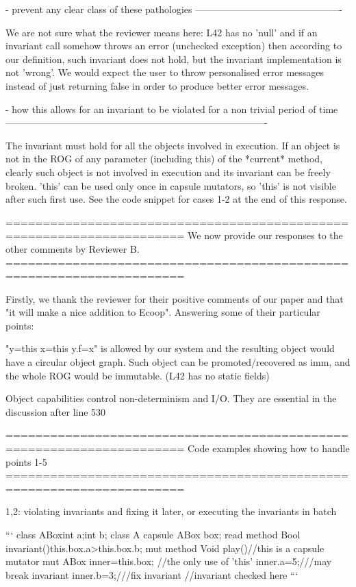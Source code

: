 - prevent any clear class of these pathologies
----------------------------------------------

We are not sure what the reviewer means here: L42 has no 'null' and if an invariant call
somehow throws an error (unchecked exception) then according to our definition,
such invariant does not hold, but the invariant implementation is not 'wrong'.
We would expect the user to throw personalised error messages instead of just returning false
in order to produce better error messages.

- how this allows for an invariant to be violated for a non trivial period of time
----------------------------------------------------------------------------------

The invariant must hold for all the objects involved in execution.
If an object is not in the ROG of any parameter (including this) of the *current* method,
clearly such object is not involved in execution and its invariant can be freely broken.
'this' can be used only once in capsule mutators, so 'this' is not visible after such first use.
See the code snippet for cases 1-2 at the end of this response.


======================================================================
We now provide our responses to the other comments by Reviewer B.
======================================================================

Firstly, we thank the reviewer for their positive comments of our paper and that "it will make a nice addition to Ecoop".
Answering some of their particular points: 

"y=this x=this y.f=x" is allowed by our system and the resulting object would have a circular object graph.
Such object can be promoted/recovered as imm, and the whole ROG would be immutable.
(L42 has no static fields)

Object capabilities control non-determinism and I/O. They are essential in the discussion after line 530


======================================================================
Code examples showing how to handle points 1-5
======================================================================

1,2: violating invariants and fixing it later, or executing the invariants in batch

```
  class ABox{int a;int b;}
  class A{
    capsule ABox box;
    read method Bool invariant(){this.box.a>this.box.b;}
    mut method Void play(){//this is a capsule mutator
      mut ABox inner=this.box; //the only use of 'this'
      inner.a=5;///may break invariant
      inner.b=3;///fix invariant
      //invariant checked here
    }
  }
```

